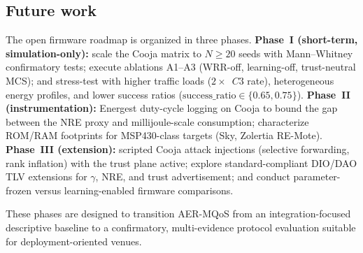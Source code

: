 \subsection{Future work}
The open firmware roadmap is organized in three phases. \textbf{Phase~I (short-term, simulation-only):} scale the Cooja matrix to $N{\geq}20$ seeds with Mann--Whitney confirmatory tests; execute ablations A1--A3 (WRR-off, learning-off, trust-neutral MCS); and stress-test with higher traffic loads ($2\times$~$C3$ rate), heterogeneous energy profiles, and lower success ratios ($\mathrm{success\_ratio}{\in}\{0.65,0.75\}$). \textbf{Phase~II (instrumentation):} Energest duty-cycle logging on Cooja to bound the gap between the NRE proxy and millijoule-scale consumption; characterize ROM/RAM footprints for MSP430-class targets (Sky, Zolertia RE-Mote). \textbf{Phase~III (extension):} scripted Cooja attack injections (selective forwarding, rank inflation) with the trust plane active; explore standard-compliant DIO/DAO TLV extensions for $\gamma$, NRE, and trust advertisement; and conduct parameter-frozen versus learning-enabled firmware comparisons.

These phases are designed to transition AER-MQoS from an integration-focused descriptive baseline to a confirmatory, multi-evidence protocol evaluation suitable for deployment-oriented venues.